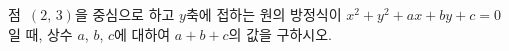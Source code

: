 점~$(2,\,3)$을 중심으로 하고 $y$축에 접하는 원의 방정식이 $x^2+y^2+ax+by+c=0$일 때, 상수 $a$, $b$, $c$에 대하여 $a+b+c$의 값을 구하시오.
